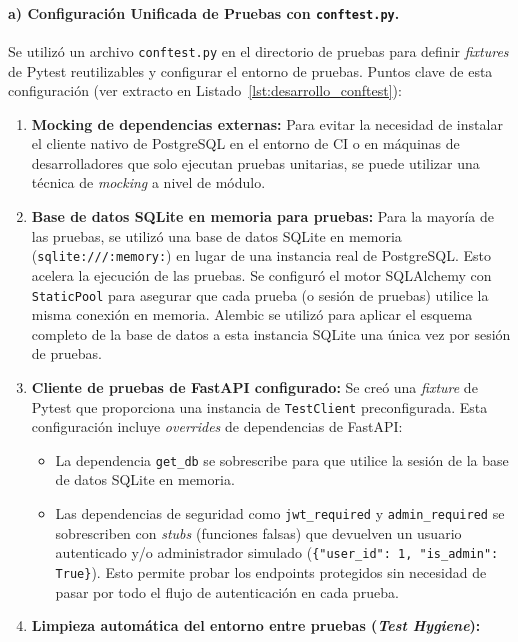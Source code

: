 \paragraph{a) Configuración Unificada de Pruebas con \texttt{conftest.py}.}
Se utilizó un archivo \texttt{conftest.py} en el directorio de pruebas para definir \emph{fixtures} de Pytest reutilizables y configurar el entorno de pruebas. Puntos clave de esta configuración (ver extracto en Listado~\ref{lst:desarrollo_conftest}):
\begin{enumerate}[leftmargin=*]
  \item \textbf{Mocking de dependencias externas:} Para evitar la necesidad de instalar el cliente nativo de PostgreSQL en el entorno de CI o en máquinas de desarrolladores que solo ejecutan pruebas unitarias, se puede utilizar una técnica de \emph{mocking} a nivel de módulo.
  \item \textbf{Base de datos SQLite en memoria para pruebas:} Para la mayoría de las pruebas, se utilizó una base de datos SQLite en memoria \\ (\texttt{sqlite:///:memory:}) en lugar de una instancia real de PostgreSQL. Esto acelera la ejecución de las pruebas. Se configuró el motor SQLAlchemy con \texttt{StaticPool} para asegurar que cada prueba (o sesión de pruebas) utilice la misma conexión en memoria. Alembic se utilizó para aplicar el esquema completo de la base de datos a esta instancia SQLite una única vez por sesión de pruebas.
  \item \textbf{Cliente de pruebas de FastAPI configurado:} Se creó una \emph{fixture} de Pytest que proporciona una instancia de \texttt{TestClient} preconfigurada. Esta configuración incluye \emph{overrides} de dependencias de FastAPI:
        \begin{itemize}
            \item La dependencia \texttt{get\_db} se sobrescribe para que utilice la sesión de la base de datos SQLite en memoria.
            \item Las dependencias de seguridad como \texttt{jwt\_required} y \texttt{admin\_required} se sobrescriben con \emph{stubs} (funciones falsas) que devuelven un usuario autenticado y/o administrador simulado (\texttt{\{"user\_id": 1, "is\_admin": True\}}). Esto permite probar los endpoints protegidos sin necesidad de pasar por todo el flujo de autenticación en cada prueba.
        \end{itemize}
  \item \textbf{Limpieza automática del entorno entre pruebas (\emph{Test Hygiene}):}

\end{enumerate}
